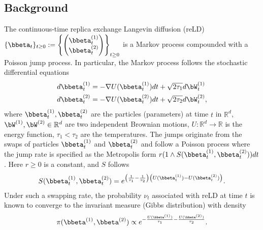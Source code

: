 
\subsection{Background}
The continuous-time replica exchange Langevin diffusion (reLD) $\{ \bbeta_t\}_{t\ge 0 }:=\left\{\begin{pmatrix}{}
\bbeta_t^{(1)}\\
\bbeta_t^{(2)}
\end{pmatrix}\right\}_{t\ge 0 }$ is a Markov process compounded with a Poisson jump process. In particular, the Markov process follows the stochastic differential equations
\begin{equation}
\label{sde_2}
\begin{split}
    d \bbeta^{(1)}_t &= - \nabla U(\bbeta_t^{(1)}) dt+\sqrt{2\tau_1} d\bW_t^{(1)}\\
    d \bbeta^{(2)}_t &= - \nabla U(\bbeta_t^{(2)}) dt+\sqrt{2\tau_2} d\bW_t^{(2)},\\
\end{split}
\end{equation}
where $\bbeta_t^{(1)}, \bbeta_t^{(2)}$ are the particles (parameters) at time $t$ in $\mathbb{R}^d$, $\bW^{(1)}, \bW^{(2)}\in\mathbb{R}^d$ are two independent Brownian motions, $U:\mathbb{R}^d\rightarrow \mathbb{R}$ is the energy function, $\tau_1<\tau_2$ are the temperatures. The jumps originate from the swaps of particles $\bbeta_t^{(1)}$ and $\bbeta_t^{(2)}$ and follow a Poisson process where the jump rate is specified as the Metropolis form $r (1\wedge S(\bbeta_t^{(1)}, \bbeta_t^{(2)}))dt$. Here $r\geq 0$ is a constant, and $S$ follows
\begin{equation*}
\label{swap_1}
\begin{split}
    S(\bbeta_t^{(1)}, \bbeta_t^{(2)})=e^{ \left(\frac{1}{\tau_1}-\frac{1}{\tau_2}\right)\left(U(\bbeta_t^{(1)})-U(\bbeta_t^{(2)})\right)}.\\
\end{split}
\end{equation*}
Under such a swapping rate, the probability $\nu_t$ associated with reLD at time $t$ is known to converge to the invariant measure (Gibbs distribution) with density
\begin{equation*}
\label{pt_density}
\begin{split}
    \pi(\bbeta^{(1)}, \bbeta^{(2)})\propto e^{-\frac{U(\bbeta^{(1)})}{\tau_1}-\frac{U(\bbeta^{(2)})}{\tau_2}}.
\end{split}
\end{equation*}

